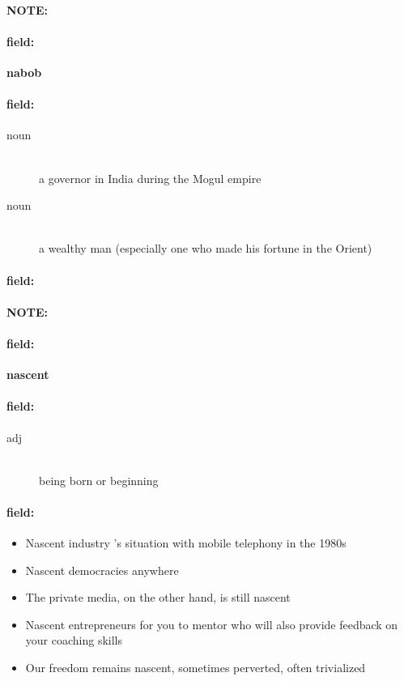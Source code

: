 \documentclass[12pt]{article}
\newenvironment{note}{\paragraph{NOTE:}}{}
\newenvironment{field}{\paragraph{field:}}{}
\begin{document}
\begin{note}
\begin{field}
\textbf{\large nabob}
\end{field}


\begin{field}
\begin{description}
\item[noun] \hfill \\ 
a governor in India during the Mogul empire

\item[noun] \hfill \\ 
a wealthy man (especially one who made his fortune in the Orient)

\end{description}
\end{field}

\begin{field}
\end{field}
\end{note}
\begin{note}
\begin{field}
\textbf{\large nascent}
\end{field}


\begin{field}
\begin{description}
\item[adj] \hfill \\ 
being born or beginning

\end{description}
\end{field}

\begin{field}
\begin{itemize}
\item Nascent industry 's situation with mobile telephony in the 1980s
\item Nascent democracies anywhere
\item The private media, on the other hand, is still nascent
\item Nascent entrepreneurs for you to mentor who will also provide feedback on your coaching skills
\item Our freedom remains nascent, sometimes perverted, often trivialized
\end{itemize}
\end{field}
\end{note}
\end{document}
